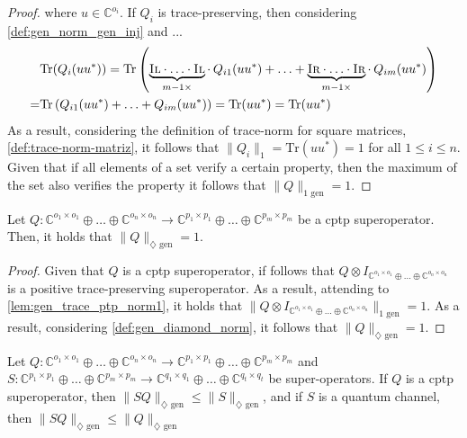 \begin{proof}
  where $u \in \mathbb{C}^{o_i}$.
  If $Q_i$ is trace-preserving, then considering \autoref{def:gen_norm_gen_inj} and ...
  \begin{equation}
    \begin{split}
    &\text{Tr} (Q_i(u u^{*})) =  \text{Tr} \left( \underbrace{\textsc{Il} \cdot \ldots \cdot \textsc{Il}}_{m-1 \times } \cdot \hspace{2pt} Q_{i1} (u u^{*}) + \ldots + \underbrace{\textsc{Ir} \cdot \ldots \cdot \textsc{Ir}}_{m-1 \times } \cdot  \hspace{2pt} Q_{im}(u u^{*}) \right) \\
    =&   \text{Tr} \left( Q_{i1} (u u^{*}) + \ldots + Q_{im}(u u^{*}) \right) = \text{Tr} (u u^{*}) = \text{Tr} (u u^{*})
  \end{split}
  \end{equation}
  As a result, considering the definition of trace-norm for square matrices, \autoref{def:trace-norm-matriz},  it follows that $\lVert Q_i \rVert_{1} = \text{Tr} (u u^{*}) = 1$ for all $1 \leq i \leq n$. Given that if all elements of a set verify a certain property, then the maximum of the set also verifies the property it follows that $\lVert Q \rVert_{1 \text{ gen}} = 1$.
  
  \end{proof}
  
  \begin{lemma} \label{lem:gen_diamond_cptp_norm}
    Let  $Q: \mathbb{C}^{o_1 \times o_1} \oplus \ldots \oplus \mathbb{C}^{o_n \times o_n}  \rightarrow \mathbb{C}^{p_1 \times p_1} \oplus \ldots \oplus  \mathbb{C}^{p_m \times p_m}$ be a \acrshort{cptp} superoperator. Then, it holds that $\lVert Q \rVert_{\diamondsuit \text{ gen}} = 1$.
  \end{lemma}
  
  \begin{proof}
    Given that $Q$ is a \acrshort{cptp} superoperator, if follows that $ Q \otimes I_{\mathbb{C}^{o_1 \times o_1} \oplus \ldots \oplus \mathbb{C}^{o_n \times o_n}}$ is a positive trace-preserving superoperator. As a result, attending to \autoref{lem:gen_trace_ptp_norm1}, it holds that $\lVert Q \otimes I_{\mathbb{C}^{o_1 \times o_1} \oplus \ldots \oplus \mathbb{C}^{o_n \times o_n}} \rVert_{1 \text{ gen}} = 1$. As a result, considering  \autoref{def:gen_diamond_norm}, it follows that $\lVert Q \rVert_{\diamondsuit \text{ gen}} = 1$.
  \end{proof}
  
  \begin{theorem}
    Let  $Q: \mathbb{C}^{o_1 \times o_1} \oplus \ldots \oplus \mathbb{C}^{o_n \times o_n}  \rightarrow \mathbb{C}^{p_1 \times p_1} \oplus \ldots \oplus  \mathbb{C}^{p_m \times p_m}$ and $S: \mathbb{C}^{p_1 \times p_1} \oplus \ldots \oplus \mathbb{C}^{p_m \times p_m}  \rightarrow \mathbb{C}^{q_1 \times q_1} \oplus \ldots \oplus \mathbb{C}^{q_t \times q_t}$ be super-operators. If $Q$ is a \acrshort{cptp} superoperator, then $\lVert S  Q \rVert_{\diamondsuit \text{ gen}} \leq \lVert S \rVert_{\diamondsuit \text{ gen}}$, and if $S$ is a quantum channel, then $\lVert S  Q \rVert_{\diamondsuit \text{ gen}} \leq \lVert Q \rVert_{\diamondsuit \text{ gen}}$
  \end{theorem}
  
